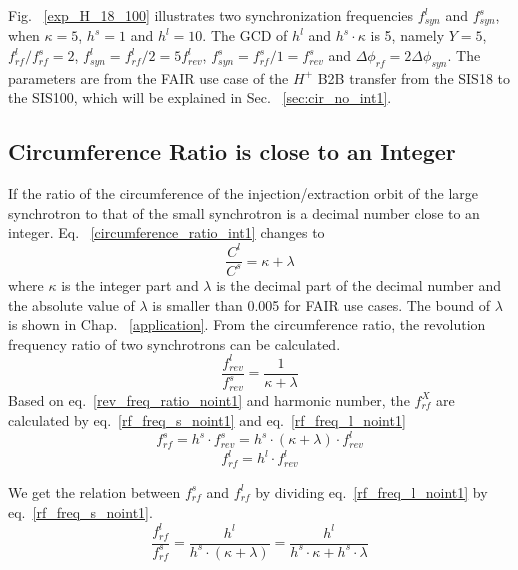 Fig. ~\ref{exp_H_18_100} illustrates two synchronization frequencies $f_{\mathit{syn}}^{l}$ and $f_{\mathit{syn}}^{s}$, when $\kappa=5$, $h^s=1$ and $h^l=10$. The GCD of $h^l$ and $h^s \cdot \kappa$ is 5, namely $Y=5$, $f_{\mathit{rf}}^{l}/f_{\mathit{rf}}^{s}=2$, $f_{\mathit{syn}}^{l}=f_{\mathit{rf}}^{l}/2=5f_{\mathit{rev}}^{l}$, $f_{\mathit{syn}}^{s}=f_{\mathit{rf}}^{s}/1=f_{\mathit{rev}}^{s}$ and $\Delta \phi_\mathit{rf}=2\Delta \phi_\mathit{syn}$.  The parameters are from the FAIR use case of the $H^{+}$ B2B transfer from the SIS18 to the SIS100, which will be explained in Sec. ~\ref{sec:cir_no_int1}.


\subsection{Circumference Ratio is close to an Integer}
\label{sec:cir_close_an_int}
If the ratio of the circumference of the injection/extraction orbit of the large synchrotron to that of the small synchrotron is a decimal number close to an integer. Eq. ~\ref{circumference_ratio_int1} changes to 
\begin{equation}
\frac{C^l}{C^s}= \kappa + \lambda \label{circumference_ratio_noint0}
\end{equation}
where $\kappa$ is the integer part and $\lambda$ is the decimal part of the decimal number and the absolute value of $\lambda$ is smaller than 0.005 for FAIR use cases. The bound of $\lambda$ is shown in Chap. ~\ref{application}. From the circumference ratio, the revolution frequency ratio of two synchrotrons can be calculated.
\begin{equation}
\frac{f_{\mathit{rev}}^{l}}{f_{\mathit{rev}}^{s}}=\frac{1}{ \kappa+ \lambda} \label{rev_freq_ratio_noint1}
\end{equation}
Based on eq.~\ref{rev_freq_ratio_noint1} and harmonic number, the $f_{\mathit{rf}}^{X}$ are calculated by eq.~\ref{rf_freq_s_noint1} and eq.~\ref{rf_freq_l_noint1}
\begin{equation} 
f_{\mathit{rf}}^{s}= h^s \cdot f_{\mathit{rev}}^{s}=h^s \cdot ( \kappa+ \lambda) \cdot f_{\mathit{rev}}^{l} \label{rf_freq_s_noint1}
\end{equation}
\begin{equation} 
f_{\mathit{rf}}^{l}= h^l \cdot f_{\mathit{rev}}^{l} \label{rf_freq_l_noint1}
\end{equation}

We get the relation between $f_{\mathit{rf}}^{s}$ and $f_{\mathit{rf}}^{l}$ by dividing eq.~\ref{rf_freq_l_noint1} by eq.~\ref{rf_freq_s_noint1}.
\begin{equation} 
\frac{f_{\mathit{rf}}^{l}}{f_{\mathit{rf}}^{s}}=\frac{h^l}{h^s \cdot ( \kappa+ \lambda)}=\frac{h^l}{h^s \cdot  \kappa+ h^s \cdot \lambda}\label{close_to_interger_31}
\end{equation}

